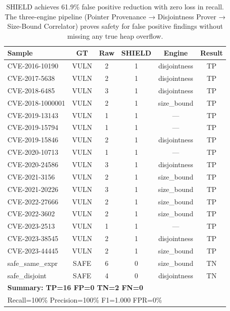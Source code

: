 \begin{table}[t]
\vspace{6pt}

\begin{subtable}{\textwidth}
\centering
\caption{Per-Sample Detection Results}
\label{tab:per_sample}
\begin{tabular}{lccccc}
\toprule
\textbf{Sample} & \textbf{GT} & \textbf{Raw} & \textbf{SHIELD} & \textbf{Engine} & \textbf{Result} \\
\midrule
CVE-2016-10190 & VULN & 2 & 1 & disjointness & TP \\
CVE-2017-5638  & VULN & 2 & 1 & disjointness & TP \\
CVE-2018-6485  & VULN & 3 & 1 & disjointness & TP \\
CVE-2018-1000001 & VULN & 2 & 1 & size\_bound & TP \\
CVE-2019-13143 & VULN & 1 & 1 & — & TP \\
CVE-2019-15794 & VULN & 1 & 1 & — & TP \\
CVE-2019-15846 & VULN & 2 & 1 & disjointness & TP \\
CVE-2020-10713 & VULN & 1 & 1 & — & TP \\
CVE-2020-24586 & VULN & 3 & 1 & disjointness & TP \\
CVE-2021-3156  & VULN & 2 & 1 & size\_bound & TP \\
CVE-2021-20226 & VULN & 3 & 1 & size\_bound & TP \\
CVE-2022-27666 & VULN & 2 & 1 & size\_bound & TP \\
CVE-2022-3602  & VULN & 2 & 1 & size\_bound & TP \\
CVE-2023-2513  & VULN & 1 & 1 & — & TP \\
CVE-2023-38545 & VULN & 2 & 1 & disjointness & TP \\
CVE-2023-44445 & VULN & 2 & 1 & size\_bound & TP \\
safe\_same\_expr & SAFE & 6 & 0 & size\_bound & TN \\
safe\_disjoint  & SAFE & 4 & 0 & disjointness & TN \\
\midrule
\multicolumn{6}{l}{\textbf{Summary: TP=16 FP=0 TN=2 FN=0}} \\
\multicolumn{6}{l}{Recall=100\% Precision=100\% F1=1.000 FPR=0\%} \\ %
\bottomrule
\end{tabular}
\end{subtable}

\vspace{6pt}
\caption*{\small SHIELD achieves 61.9\% false positive reduction with zero loss in recall. The three-engine pipeline (Pointer Provenance → Disjointness Prover → Size-Bound Correlator) proves safety for false positive findings without missing any true heap overflow.}
\end{table}
